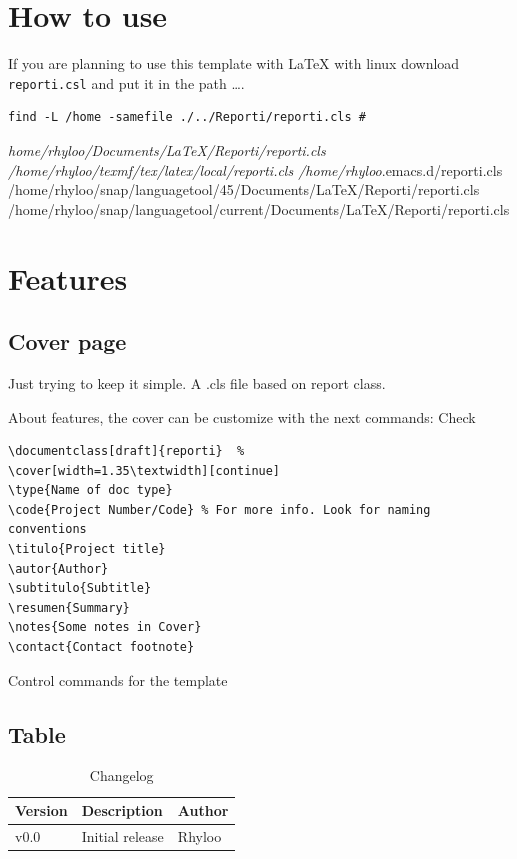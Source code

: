 \documentclass[english]{reporti}
\begin{document}
\section{How to use}
\label{sec:orgf011c67}
If you are planning to use this template with \LaTeX{} with linux download \texttt{reporti.csl} and put it in the path \ldots{}.

\begin{verbatim}
find -L /home -samefile ./../Reporti/reporti.cls # 
\end{verbatim}

\emph{home/rhyloo/Documents/\LaTeX{}/Reporti/reporti.cls
/home/rhyloo/texmf/tex/latex/local/reporti.cls
/home/rhyloo}.emacs.d/reporti.cls
/home/rhyloo/snap/languagetool/45/Documents/\LaTeX{}/Reporti/reporti.cls
/home/rhyloo/snap/languagetool/current/Documents/\LaTeX{}/Reporti/reporti.cls

\section{Features}
\label{sec:orgf58a2b1}
\subsection{Cover page}
\label{sec:org04824df}
Just trying to keep it simple. A .cls file based on report class.

About features, the cover can be customize with the next commands: Check 

\begin{listing}[htbp]
\begin{verbatim}
\documentclass[draft]{reporti}  %
\cover[width=1.35\textwidth][continue]
\type{Name of doc type}
\code{Project Number/Code} % For more info. Look for naming conventions
\titulo{Project title} 
\autor{Author}
\subtitulo{Subtitle}
\resumen{Summary}
\notes{Some notes in Cover}
\contact{Contact footnote}
\end{verbatim}
\caption{Control commands for the template}
\end{listing}

\subsection{Table}
\label{sec:org1931555}
\begin{table}[H]
\caption{Changelog}
\centering
\begin{tabular}{lll}
\hline
Version & Description & Author\\[0pt]
\hline
v0.0 & Initial release & Rhyloo\\[0pt]
\hline
\end{tabular}
\end{table}
\end{document}
